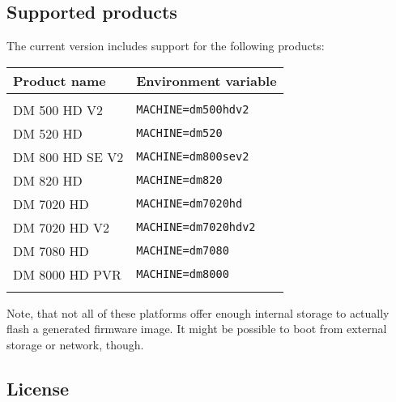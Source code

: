 \documentclass[a4paper]{article}
\newcommand{\shell}[1]{\texttt{\small #1}}
\begin{document}
  \subsection{Supported products}
    \label{products}
    \begin{flushleft}
      The current version includes support for the following products:

        \begin{tabular}{ | l | l | }
          \hline
          \textbf{Product name} & \textbf{Environment variable} \\ \hline
          & \\
          DM 500 HD V2 & \shell{MACHINE=dm500hdv2} \\
          DM 520 HD & \shell{MACHINE=dm520} \\
          DM 800 HD SE V2 & \shell{MACHINE=dm800sev2} \\
          DM 820 HD & \shell{MACHINE=dm820} \\
          DM 7020 HD & \shell{MACHINE=dm7020hd} \\
          DM 7020 HD V2 & \shell{MACHINE=dm7020hdv2} \\
          DM 7080 HD & \shell{MACHINE=dm7080} \\
          DM 8000 HD PVR & \shell{MACHINE=dm8000} \\
          & \\
          \hline
        \end{tabular}

      Note, that not all of these platforms offer enough internal
      storage to actually flash a generated firmware image. It might be possible
      to boot from external storage or network, though.
    \end{flushleft}

  \subsection{License}
\end{document}
